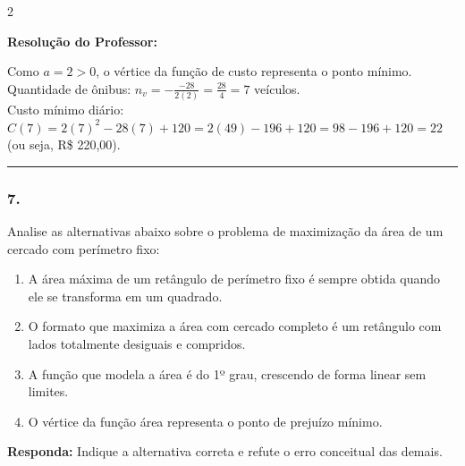 \begin{multicols*}{2}
\ifgabarito
    \begin{tcolorbox}[colback=CorTitUm!5, colframe=CorTitUm, boxrule=1pt, arc=4pt, left=6pt, right=6pt, top=6pt, bottom=6pt]
    \small\textbf{\textcolor{CorTitUm}{Resolução do Professor:}}\par\vspace{0.1cm}
    \color{CinzaEscuro}
    Como $a = 2 > 0$, o vértice da função de custo representa o ponto mínimo. \\
    Quantidade de ônibus: $n_v = -\frac{-28}{2(2)} = \frac{28}{4} = 7$ veículos. \\
    Custo mínimo diário: $C(7) = 2(7)^2 - 28(7) + 120 = 2(49) - 196 + 120 = 98 - 196 + 120 = 22$ (ou seja, R\$ 220,00).
    \end{tcolorbox}
\fi

\par\vspace{\espacoQuestao}

\noindent\textcolor{CorLinha}{\rule{\linewidth}{0.5pt}} 
\par\vspace{\espacoPreQuestao}
\subsubsection*{7.} Analise as alternativas abaixo sobre o problema de maximização da área de um cercado com perímetro fixo:

\begin{enumerate}[label=\alph*), itemsep=\espacoAlt]
\item A área máxima de um retângulo de perímetro fixo é sempre obtida quando ele se transforma em um quadrado.
\item O formato que maximiza a área com cercado completo é um retângulo com lados totalmente desiguais e compridos.
\item A função que modela a área é do 1º grau, crescendo de forma linear sem limites.
\item O vértice da função área representa o ponto de prejuízo mínimo.
\end{enumerate}

\begin{boxresponda}
\textbf{Responda:} Indique a alternativa correta e refute o erro conceitual das demais.
\end{boxresponda}


\end{multicols*}
